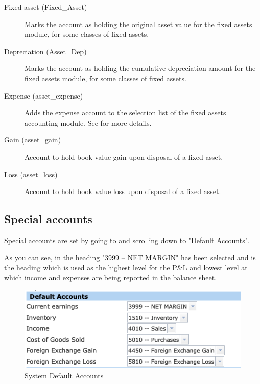 \begin{description}
    \item[Fixed asset (Fixed\_Asset)] Marks the account as holding the original asset value for the fixed
    assets module, for some classes of fixed assets.
    \item[Depreciation (Asset\_Dep)] Marks the account as holding the cumulative depreciation amount
    for the fixed assets module, for some classes of fixed assets.
    \item[Expense (asset\_expense)] Adds the expense account to the selection list of the fixed assets
    accounting module. See  for more details.
    \item[Gain (asset\_gain)] Account to hold book value gain upon disposal of a fixed asset.
    \item[Loss (asset\_loss)] Account to hold book value loss upon disposal of a fixed asset.
\end{description}

\subsection{Special accounts}
\label{subsec-company-config-coa-special-accounts}

Special accounts are set by going to  and scrolling down to "Default Accounts".

As you can see, in  the heading "3999 -- NET MARGIN" has been selected and is the heading which is used as the highest level for the P\&L and lowest level at which income and expenses are being reported in the balance sheet.

\begin{figure}[H]
    \centering
    \includegraphics[width=\graphicswidth]{images/system-default-accounts.png}
    \caption{System Default Accounts}
    \label{fig:system-default-accounts}
\end{figure}

